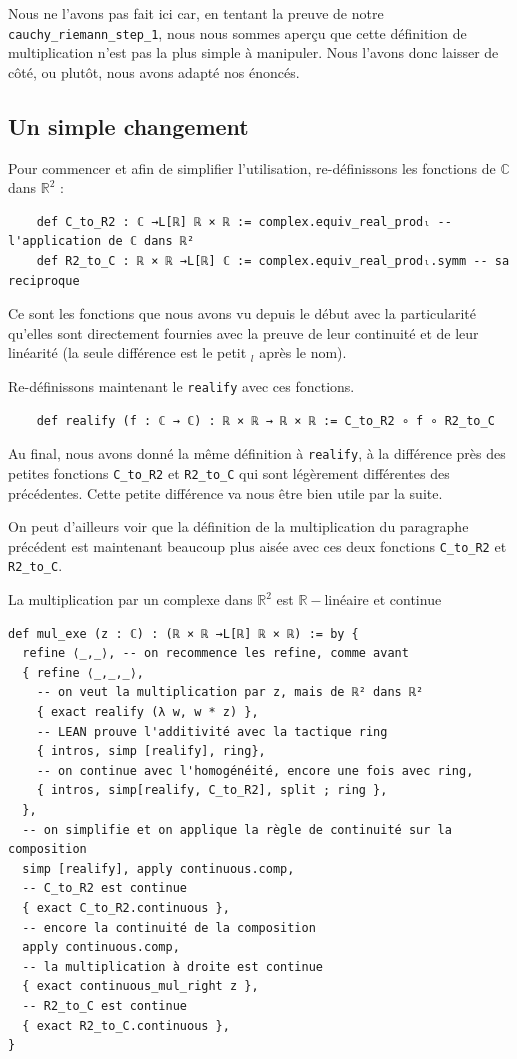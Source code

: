 \documentclass[a4paper, 11pt, twoside]{report}
\newcommand\R{\mathbb{R}}
\newcommand\C{\mathbb{C}}
\begin{document}
Nous ne l'avons pas fait ici car, en tentant la preuve de notre \verb|cauchy_riemann_step_1|, nous nous sommes aperçu que cette définition de multiplication n'est pas la plus simple à manipuler. Nous l'avons donc laisser de côté, ou plutôt, nous avons adapté nos énoncés.

	\subsection{Un simple changement}
	
	Pour commencer et afin de simplifier l'utilisation, re-définissons les fonctions de $\C$ dans $\R^2$ :
	
\begin{lstlisting}
	def C_to_R2 : ℂ →L[ℝ] ℝ × ℝ := complex.equiv_real_prodₗ -- l'application de ℂ dans ℝ²
	def R2_to_C : ℝ × ℝ →L[ℝ] ℂ := complex.equiv_real_prodₗ.symm -- sa reciproque 
\end{lstlisting}

Ce sont les fonctions que nous avons vu depuis le début avec la particularité qu'elles sont directement fournies avec la preuve de leur continuité et de leur linéarité (la seule différence est le petit $_l$ après le nom). 

\medskip

Re-définissons maintenant le \verb|realify| avec ces fonctions. 

\begin{lstlisting}
	def realify (f : ℂ → ℂ) : ℝ × ℝ → ℝ × ℝ := C_to_R2 ∘ f ∘ R2_to_C  
\end{lstlisting}

Au final, nous avons donné la même définition à \verb|realify|, à la différence près des petites fonctions \verb|C_to_R2| et \verb|R2_to_C| qui sont légèrement différentes des précédentes. Cette petite différence va nous être bien utile par la suite.

On peut d'ailleurs voir que la définition de la multiplication du paragraphe précédent est maintenant beaucoup plus aisée avec ces deux fonctions \verb|C_to_R2| et \verb|R2_to_C|.

\begin{code}{La multiplication par un complexe dans $\R^2$ est $\R-$linéaire et continue}
\begin{lstlisting}
def mul_exe (z : ℂ) : (ℝ × ℝ →L[ℝ] ℝ × ℝ) := by {
  refine ⟨_,_⟩, -- on recommence les refine, comme avant
  { refine ⟨_,_,_⟩,
    -- on veut la multiplication par z, mais de ℝ² dans ℝ²
    { exact realify (λ w, w * z) }, 
    -- LEAN prouve l'additivité avec la tactique ring
    { intros, simp [realify], ring}, 
    -- on continue avec l'homogénéité, encore une fois avec ring,
    { intros, simp[realify, C_to_R2], split ; ring }, 
  },
  -- on simplifie et on applique la règle de continuité sur la composition
  simp [realify], apply continuous.comp,
  -- C_to_R2 est continue
  { exact C_to_R2.continuous },
  -- encore la continuité de la composition
  apply continuous.comp,
  -- la multiplication à droite est continue
  { exact continuous_mul_right z },
  -- R2_to_C est continue
  { exact R2_to_C.continuous },
}
\end{lstlisting}
\end{code}
\end{document}
